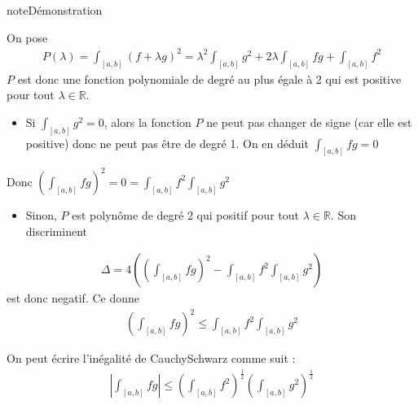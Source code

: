 \documentclass[letterpaper,10pt,french]{sphinxmanual}
\begin{document}
\begin{sphinxadmonition}{note}{Démonstration}

\sphinxAtStartPar
On pose
\begin{equation*}
\begin{split}
P(\lambda) = \int_{[a, b]} (f+\lambda g)^2 = \lambda^2 \int_{[a, b]} g^2 + 2\lambda \int_{[a, b]} fg + \int_{[a, b]} f^2
\end{split}
\end{equation*}
\sphinxAtStartPar
\(P\) est donc une fonction polynomiale de degré au plus égale à 2 qui est positive pour tout \(\lambda \in \mathbb R\).
\begin{itemize}
\item {} 
\sphinxAtStartPar
Si \(\int_{[a, b]} g^2 = 0\), alors la fonction \(P\) ne peut pas changer de signe (car elle est positive) donc ne peut pas être de degré 1. On en déduit \(\int_{[a, b]} fg = 0\)

\end{itemize}

\sphinxAtStartPar
Donc \(\left (\int_{[a, b]} fg\right)^2 = 0=\int_{[a, b]} f^2 \int_{[a, b]} g^2\)
\begin{itemize}
\item {} 
\sphinxAtStartPar
Sinon, \(P\) est polynôme de degré 2 qui positif pour tout \(\lambda \in \mathbb R\). Son discriminent

\end{itemize}
\begin{equation*}
\begin{split}
\Delta = 4 \left (\left (\int_{[a, b]} fg\right)^2- \int_{[a, b]} f^2 \int_{[a, b]} g^2 \right)
\end{split}
\end{equation*}
\sphinxAtStartPar
est donc negatif. Ce donne
\begin{equation*}
\begin{split}
\left (\int_{[a, b]} fg\right)^2 \leq \int_{[a, b]} f^2 \int_{[a, b]} g^2
\end{split}
\end{equation*}\end{sphinxadmonition}

\sphinxAtStartPar
On peut écrire l’inégalité de Cauchy\sphinxhyphen{}Schwarz comme suit :
\begin{equation*}
\begin{split}
\left |\int_{[a, b]}fg \right | \leq \left (\int_{[a, b]} f^2 \right)^{\frac{1}{2}}  \left (\int_{[a, b]}g^2\right)^{\frac{1}{2}} 
\end{split}
\end{equation*}
\end{document}
